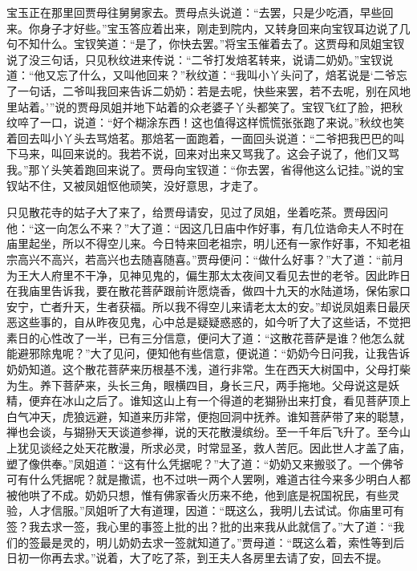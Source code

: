\begin{parag}
    宝玉正在那里回贾母往舅舅家去。贾母点头说道：“去罢，只是少吃酒，早些回来。你身子才好些。”宝玉答应着出来，刚走到院内，又转身回来向宝钗耳边说了几句不知什么。宝钗笑道：“是了，你快去罢。”将宝玉催着去了。这贾母和凤姐宝钗说了没三句话，只见秋纹进来传说：“二爷打发焙茗转来，说请二奶奶。”宝钗说道：“他又忘了什么，又叫他回来？”秋纹道：“我叫小丫头问了，焙茗说是‘二爷忘了一句话，二爷叫我回来告诉二奶奶：若是去呢，快些来罢，若不去呢，别在风地里站着。’”说的贾母凤姐并地下站着的众老婆子丫头都笑了。宝钗飞红了脸，把秋纹啐了一口，说道：“好个糊涂东西！这也值得这样慌慌张张跑了来说。”秋纹也笑着回去叫小丫头去骂焙茗。那焙茗一面跑着，一面回头说道：“二爷把我巴巴的叫下马来，叫回来说的。我若不说，回来对出来又骂我了。这会子说了，他们又骂我。”那丫头笑着跑回来说了。贾母向宝钗道：“你去罢，省得他这么记挂。”说的宝钗站不住，又被凤姐怄他顽笑，没好意思，才走了。
\end{parag}


\begin{parag}
    只见散花寺的姑子大了来了，给贾母请安，见过了凤姐，坐着吃茶。贾母因问他：“这一向怎么不来？”大了道：“因这几日庙中作好事，有几位诰命夫人不时在庙里起坐，所以不得空儿来。今日特来回老祖宗，明儿还有一家作好事，不知老祖宗高兴不高兴，若高兴也去随喜随喜。”贾母便问：“做什么好事？”大了道：“前月为王大人府里不干净，见神见鬼的，偏生那太太夜间又看见去世的老爷。因此昨日在我庙里告诉我，要在散花菩萨跟前许愿烧香，做四十九天的水陆道场，保佑家口安宁，亡者升天，生者获福。所以我不得空儿来请老太太的安。”却说凤姐素日最厌恶这些事的，自从昨夜见鬼，心中总是疑疑惑惑的，如今听了大了这些话，不觉把素日的心性改了一半，已有三分信意，便问大了道：“这散花菩萨是谁？他怎么就能避邪除鬼呢？”大了见问，便知他有些信意，便说道：“奶奶今日问我，让我告诉奶奶知道。这个散花菩萨来历根基不浅，道行非常。生在西天大树国中，父母打柴为生。养下菩萨来，头长三角，眼横四目，身长三尺，两手拖地。父母说这是妖精，便弃在冰山之后了。谁知这山上有一个得道的老猢狲出来打食，看见菩萨顶上白气冲天，虎狼远避，知道来历非常，便抱回洞中抚养。谁知菩萨带了来的聪慧，禅也会谈，与猢狲天天谈道参禅，说的天花散漫缤纷。至一千年后飞升了。至今山上犹见谈经之处天花散漫，所求必灵，时常显圣，救人苦厄。因此世人才盖了庙，塑了像供奉。”凤姐道：“这有什么凭据呢？”大了道：“奶奶又来搬驳了。一个佛爷可有什么凭据呢？就是撒谎，也不过哄一两个人罢咧，难道古往今来多少明白人都被他哄了不成。奶奶只想，惟有佛家香火历来不绝，他到底是祝国祝民，有些灵验，人才信服。”凤姐听了大有道理，因道：“既这么，我明儿去试试。你庙里可有签？我去求一签，我心里的事签上批的出？批的出来我从此就信了。”大了道：“我们的签最是灵的，明儿奶奶去求一签就知道了。”贾母道：“既这么着，索性等到后日初一你再去求。”说着，大了吃了茶，到王夫人各房里去请了安，回去不提。
\end{parag}



